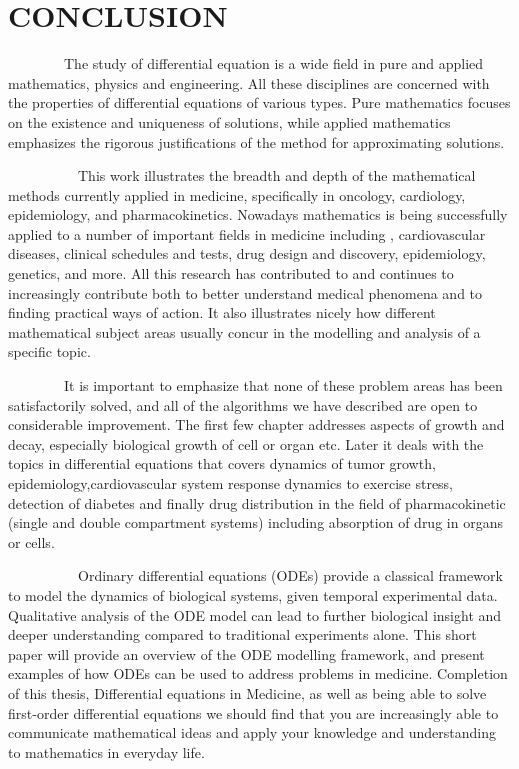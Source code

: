 \chapter*{\textbf{CONCLUSION}}
\thispagestyle{empty}

\par ~~~~~~~~The study of differential equation is a wide field in pure and applied mathematics,  physics and engineering. All these disciplines are concerned with the properties of differential equations of various types. Pure mathematics focuses on the existence and uniqueness of solutions, while applied mathematics emphasizes the rigorous justifications of the method for approximating solutions.

\par ~~~~~~~~~~This work illustrates the breadth and depth of the mathematical methods currently applied in medicine, specifically in oncology, cardiology, epidemiology, and pharmacokinetics. Nowadays mathematics is being successfully applied to a number of important fields in medicine including , cardiovascular diseases, clinical schedules and tests, drug design and discovery, epidemiology, genetics, and more. All this research has contributed to and continues to increasingly contribute both to better understand medical phenomena and to finding practical ways of action. It also illustrates nicely how different mathematical subject areas usually concur in the modelling and analysis of a specific topic.


\par ~~~~~~~~It is important to emphasize that none of these problem areas has been satisfactorily solved, and all of the algorithms we have described are open to considerable improvement. The first few chapter addresses aspects of growth and decay, especially biological growth of cell or organ etc. Later it deals with the topics in differential equations that covers dynamics of tumor growth, epidemiology,cardiovascular system response dynamics to exercise stress, detection of diabetes and finally drug distribution in the field of pharmacokinetic (single and double compartment systems) including absorption of drug in organs or cells.


\par ~~~~~~~~~~Ordinary differential equations (ODEs) provide a classical framework to model the dynamics of biological systems, given temporal experimental data. Qualitative analysis of the ODE model can lead to further biological insight and deeper understanding compared to traditional experiments alone. This short paper will provide an overview of the ODE modelling framework, and present examples of how ODEs can be used to address problems in medicine. Completion of this thesis, Differential equations in Medicine, as well as being able to solve first-order differential equations we should find that you are increasingly able to communicate mathematical ideas and apply your knowledge and understanding to mathematics in everyday life.



